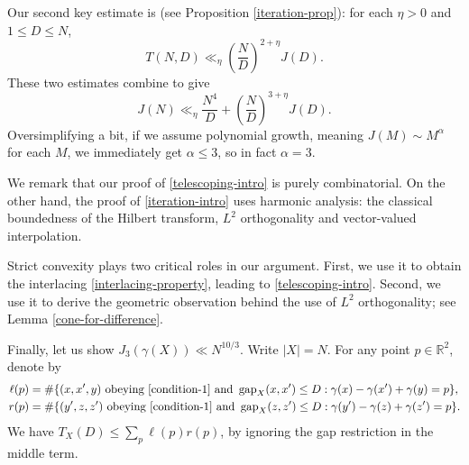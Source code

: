 \documentclass{amsart}
\numberwithin{equation}{section}
\newcommand{\ZR}{\mathbb{R}}
\begin{document}
Our second key estimate is   (see Proposition \ref{iteration-prop}): for each $\eta>0$ and $1\leq D\leq N$,
\begin{equation}
\label{iteration-intro}
    T(N,D)\ll_{\eta}\left({\frac ND}\right)^{2+\eta}J(D).
\end{equation}
These two estimates combine to give 
\begin{equation}
\nonumber
    J(N)\ll_\eta \frac{N^4}{D} +\left({\frac ND}\right)^{3+\eta}J(D).
\end{equation}
Oversimplifying a bit, if we assume polynomial growth, meaning $J(M)\sim M^\alpha$ for each $M$, we immediately get $\alpha\le 3$, so in fact $\alpha=3$.

We remark that our proof of \eqref{telescoping-intro} is purely combinatorial. 
On the other hand, the proof of  \eqref{iteration-intro} uses harmonic analysis: the classical boundedness of the Hilbert transform, $L^2$ orthogonality and vector-valued interpolation. 

Strict convexity plays two critical roles in our argument. 
First, we use it to obtain the interlacing \eqref{interlacing-property}, leading to \eqref{telescoping-intro}. 
Second, we use it to derive the geometric observation behind the use of $L^2$ orthogonality; see Lemma \ref{cone-for-difference}.


\bigskip  

Finally, let us show $J_3(\gamma(X))\ll N^{10/3}$.
Write $|X|=N$. 
For any point $p\in\ZR^2$, denote by
\begin{align}
    \nonumber
    \ell(p)
    &=
    \#\{
    (x,x',y)\text{ obeying \eqref{condition-1} and }\operatorname{gap}_X(x,x')\le D:\gamma(x)-\gamma(x')+\gamma(y)=p 
    \},\\ \nonumber
    r(p)
    &=
    \#\{
    (y',z,z')\text{ obeying \eqref{condition-1} and } \operatorname{gap}_X(z,z')\le D:\gamma(y')-\gamma(z)+\gamma(z')=p \}.
\end{align}
We have $T_X(D)\le \sum_{p}\ell(p)r(p)$, by ignoring the gap restriction in the middle term. 
\end{document}
